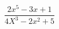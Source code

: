 \documentclass[a4paper,12pt]{article}%
\begin{document}
$$\frac{2x^{5}-3x+1}{4X^{3}-2x^{2}+5}$$
\end{document}
